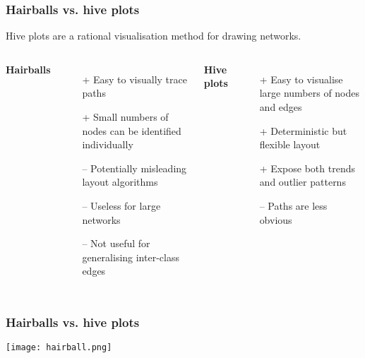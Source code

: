 \documentclass{beamer}
\begin{document}
\begin{frame}
\frametitle{Hairballs vs. hive plots}
\begin{block}{Hive plots}
are a rational visualisation method for drawing networks.
\end{block}
\begin{columns}[t]

\textbf{Hairballs}
\begin{itemize}
\item[+] Easy to visually trace paths
\item[+] Small numbers of nodes can be identified individually
\item[--] Potentially misleading layout algorithms
\item[--] Useless for large networks
\item[--] Not useful for generalising inter-class edges
\end{itemize}

\textbf{Hive plots}
\vspace{0.5cm}
\begin{itemize}
\item[+] Easy to visualise large numbers of nodes and edges
\item[+] Deterministic but flexible layout
\item[+] Expose both trends and outlier patterns
\item[--] Paths are less obvious

\end{itemize}
\end{columns}
\end{frame}

\begin{frame}
\frametitle{Hairballs vs. hive plots}
\begin{center}
\texttt{[image: hairball.png]}
\end{center}
\end{frame}
\end{document}
